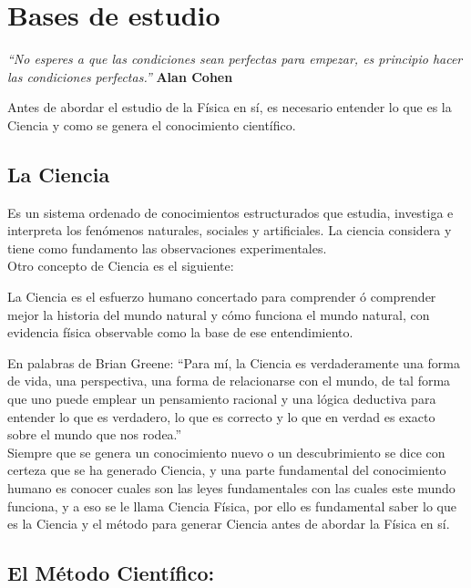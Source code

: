 \chapter{Bases de estudio}

\textit{``No esperes a que las condiciones sean perfectas para empezar, es principio hacer las condiciones perfectas.''} 
\textbf{Alan Cohen}
\vspace{1.0cm}

Antes de abordar el estudio de la Física en sí, es necesario entender lo que es la Ciencia y como se genera el conocimiento 
científico.

\section{La Ciencia}

Es un sistema ordenado de conocimientos estructurados que estudia, investiga e interpreta los fenómenos naturales, sociales y 
artificiales. La ciencia  considera y tiene como fundamento las observaciones experimentales.\\ 

Otro concepto de Ciencia es el siguiente:

\begin{tcolorbox}
La Ciencia es el esfuerzo humano concertado para comprender ó comprender mejor la historia del mundo natural y cómo funciona el 
mundo natural, con evidencia física observable como la base de ese entendimiento.
\end{tcolorbox}

En palabras de Brian Greene: ``Para mí, la Ciencia es verdaderamente una forma de vida, una perspectiva, una forma de 
relacionarse 
con el mundo, de tal forma que uno puede emplear un pensamiento racional y una lógica deductiva para entender lo que es 
verdadero, 
lo que es correcto y lo que en verdad es exacto sobre el mundo que nos rodea.''\\
 
Siempre que se genera un conocimiento nuevo o un descubrimiento se dice con certeza que se ha generado Ciencia, y una parte 
fundamental del conocimiento humano es conocer cuales son las leyes fundamentales con las cuales este mundo funciona, y  a eso se 
le llama Ciencia Física, por ello es 
fundamental saber lo que es la Ciencia y el método para generar Ciencia antes de abordar la Física en sí.

\section{El Método Científico:}

